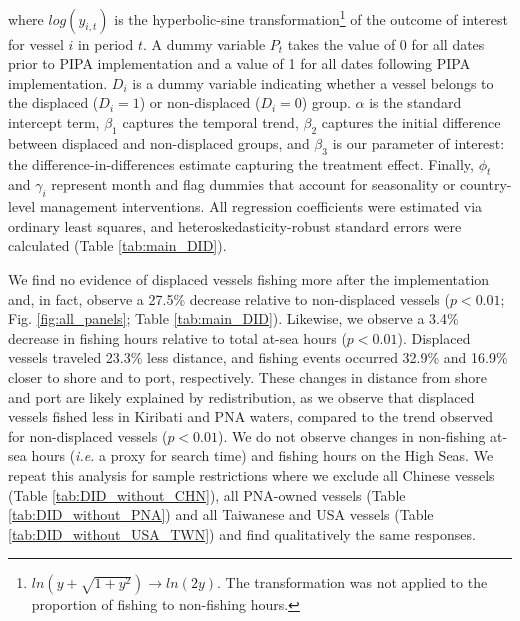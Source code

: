 \documentclass[12pt]{article}
\begin{document}
\noindent where $log(y_{i,t})$ is the hyperbolic-sine transformation\footnote{$ln\left(y + \sqrt{1 + y^2}\right)\rightarrow ln(2y)$. The transformation was not applied to the proportion of fishing to non-fishing hours.} of the outcome of interest for vessel $i$ in period $t$. A dummy variable $P_t$ takes the value of 0 for all dates prior to PIPA implementation and a value of 1 for all dates following PIPA implementation. $D_i$ is a dummy variable indicating whether a vessel belongs to the displaced ($D_i = 1$) or non-displaced ($D_i = 0$) group. $\alpha$ is the standard intercept term, $\beta_1$ captures the temporal trend, $\beta_2$ captures the initial difference between displaced and non-displaced groups, and $\beta_3$ is our parameter of interest: the difference-in-differences estimate capturing the treatment effect. Finally, $\phi_t$ and $\gamma_i$ represent month and flag dummies that account for seasonality or country-level management interventions. All regression coefficients were estimated via ordinary least squares, and heteroskedasticity-robust standard errors were calculated (Table \ref{tab:main_DID}).

We find no evidence of displaced vessels fishing more after the implementation and, in fact, observe a 27.5\% decrease relative to non-displaced vessels ($p < 0.01$; Fig. \ref{fig:all_panels}; Table \ref{tab:main_DID}). Likewise, we observe a 3.4\% decrease in fishing hours relative to total at-sea hours ($p < 0.01$). Displaced vessels traveled 23.3\% less distance, and fishing events occurred 32.9\% and 16.9\% closer to shore and to port, respectively. These changes in distance from shore and port are likely explained by redistribution, as we observe that displaced vessels fished less in Kiribati and PNA waters, compared to the trend observed for non-displaced vessels ($p < 0.01$). We do not observe changes in non-fishing at-sea hours (\emph{i.e.} a proxy for search time) and fishing hours on the High Seas. We repeat this analysis for sample restrictions where we exclude all Chinese vessels (Table \ref{tab:DID_without_CHN}), all PNA-owned vessels (Table \ref{tab:DID_without_PNA}) and all Taiwanese and USA vessels (Table \ref{tab:DID_without_USA_TWN}) and find qualitatively the same responses.
\end{document}
